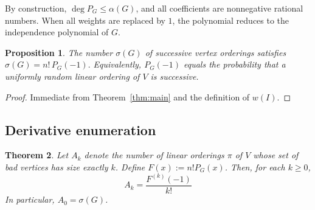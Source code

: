 \documentclass[11pt,a4paper]{article}
\numberwithin{equation}{section}
\theoremstyle{plain}
\newtheorem{theorem}{Theorem}[section]
\newtheorem{proposition}[theorem]{Proposition}
\theoremstyle{definition}
\theoremstyle{remark}
\begin{document}
By construction, \(\deg P_G \le \alpha(G)\), and all coefficients are nonnegative rational numbers. 
When all weights are replaced by \(1\), the polynomial reduces to the independence polynomial of \(G\).

\begin{proposition}\label{prop:recover}
The number \(\sigma(G)\) of successive vertex orderings satisfies
\(
\sigma(G)=n!\,P_G(-1).
\)
Equivalently, \(P_G(-1)\) equals the probability that a uniformly random linear ordering of \(V\) is successive.
\end{proposition}

\begin{proof}
Immediate from Theorem~\ref{thm:main} and the definition of \(w(I)\).
\end{proof}


\subsection{Derivative enumeration}

\begin{theorem}\label{thm:derivative}
Let \(A_k\) denote the number of linear orderings \(\pi\) of \(V\) whose set of bad vertices has size exactly \(k\). Define \(F(x):=n!P_G(x)\). Then, for each \(k\ge0\),
\[
A_k=\frac{F^{(k)}(-1)}{k!}
\]
In particular, \(A_0=\sigma(G)\).
\end{theorem}
\end{document}
